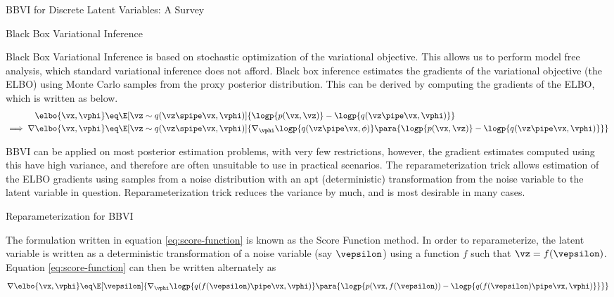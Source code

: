 \documentclass{article}
\begin{document}
\begin{psection}{BBVI for Discrete Latent Variables: A Survey}

	\begin{psubsection}{Black Box Variational Inference}

		Black Box Variational Inference \citep{bbvi} is based on stochastic optimization of the variational objective. This allows us to perform model free analysis, which standard variational inference does not afford. Black box inference estimates the gradients of the variational objective (the ELBO) using Monte Carlo samples from the proxy posterior distribution. This can be derived by computing the gradients of the ELBO, which is written as below.
		\begin{align}
			\elbo{\vx, \vphi}	&\eq \E[\vz \sim q(\vz \spipe \vx, \vphi)]{\logp{p(\vx, \vz)} - \logp{q(\vz \pipe \vx, \vphi)}} \\
			\implies \nabla \elbo{\vx, \vphi} &\eq \E[\vz \sim q(\vz \spipe \vx, \vphi)]{\nabla_\vphi \logp{q(\vz \pipe \vx, \phi)} \para{\logp{p(\vx, \vz)} - \logp{q(\vz \pipe \vx, \vphi)}}} \label{eq:score-function}
		\end{align}

		BBVI can be applied on most posterior estimation problems, with very few restrictions, however, the gradient estimates computed using this have high variance, and therefore are often unsuitable to use in practical scenarios. The reparameterization trick allows estimation of the ELBO gradients using samples from a noise distribution with an apt (deterministic) transformation from the noise variable to the latent variable in question. Reparameterization trick reduces the variance by much, and is most desirable in many cases.

	\end{psubsection}

	\begin{psubsection}{Reparameterization for BBVI}

		The formulation written in equation \ref{eq:score-function} is known as the Score Function method. In order to reparameterize, the latent variable is written as a deterministic transformation of a noise variable (say $\vepsilon$) using a function $f$ such that $\vz = f(\vepsilon)$. Equation \ref{eq:score-function} can then be written alternately as
		\begin{align}
			\nabla \elbo{\vx, \vphi} \eq \E[\vepsilon]{\nabla_{\vphi} \logp{q(f(\vepsilon) \pipe \vx, \vphi)} \para{\logp{p(\vx, f(\vepsilon)) - \logp{q(f(\vepsilon) \pipe \vx, \vphi)}}}}
			\label{eq:rep-trick}
		\end{align}


\end{psubsection}
\end{psection}
\end{document}
